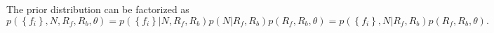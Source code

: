 \documentclass[aps,prd]{revtex4-1}
\newcommand{\mathset}[1]{\left\{ #1 \right\}}
\newcommand{\ilya}[1]{{\color{red} \bf #1}}
\begin{document}
%

The prior distribution can be factorized as
\begin{equation}
  \label{eq:combined-flag-rate-prior}
  p\left(\mathset{f_i}, N, R_f, R_b, \theta\right)  = p\left( \mathset{f_i} | N, R_f, R_b\right) p\left(N |R_f, R_b\right)   p\left(R_f, R_b, \theta\right) =  p\left( \mathset{f_i},N | R_f, R_b\right)  p\left(R_f, R_b, \theta\right).
 \end{equation}
 
\end{document}

